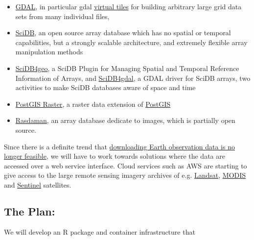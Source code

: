 \begin{itemize}
\tightlist
\item
  \href{http://www.gdal.org/}{GDAL}, in particular gdal
  \href{http://www.gdal.org/gdalbuildvrt.html}{virtual tiles} for
  building arbitrary large grid data sets from many individual files,
\item
  \href{http://www.paradigm4.com/}{SciDB}, an open source array database
  which has no spatial or temporal capabilities, but a strongly scalable
  architecture, and extremely flexible array manipulation methods
\item
  \href{https://github.com/appelmar/scidb4geo}{SciDB4geo}, a SciDB
  Plugin for Managing Spatial and Temporal Reference Information of
  Arrays, and \href{https://github.com/appelmar/scidb4geo}{SciDB4gdal},
  a GDAL driver for SciDB arrays, two activities to make SciDB databases
  aware of space and time
\item
  \href{http://postgis.net/docs/RT_reference.html}{PostGIS Raster}, a
  raster data extension of \href{http://www.postgis.net/}{PostGIS}
\item
  \href{http://www.rasdaman.com/}{Rasdaman}, an array database dedicate
  to images, which is partially open source.
\end{itemize}

Since there is a definite trend that
\href{http://r-spatial.org/2016/11/29/openeo.html}{downloading Earth
observation data is no longer feasible}, we will have to work towards
solutions where the data are accessed over a web service interface.
Cloud services such as AWS are starting to give access to the large
remote sensing imagery archives of e.g.
\href{https://aws.amazon.com/blogs/aws/start-using-landsat-on-aws/}{Landsat},
\href{https://aws.amazon.com/public-datasets/modis/}{MODIS} and
\href{http://sentinel-pds.s3-website.eu-central-1.amazonaws.com/}{Sentinel}
satellites.

\subsection*{The Plan:}\label{the-plan}

We will develop an R package and container infrastructure that


